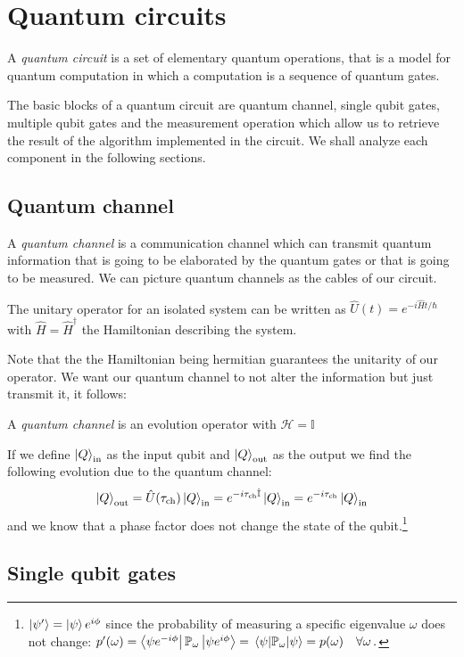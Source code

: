 \section{Quantum circuits}
A \emph{quantum circuit} is a set of elementary quantum operations, that is a model for quantum computation in which a computation is a sequence of quantum gates.

The basic blocks of a quantum circuit are quantum channel, single qubit gates, multiple qubit gates and the measurement operation which allow us to retrieve the result of the algorithm implemented in the circuit. We shall analyze each component in the following sections.
\subsection{Quantum channel}
A \emph{quantum channel} is a communication channel which can transmit quantum information that is going to be elaborated by the quantum gates or that is going to be measured. We can picture quantum channels as the cables of our circuit.
\begin{theorem}
The unitary operator for an isolated system can be written as $\hat{U}(t) = e^{-i\hat{H}t/\hbar}$ with $\hat{H} = \hat{H}^\dagger$ the Hamiltonian describing the system.
\end{theorem}
Note that the the Hamiltonian being hermitian guarantees the unitarity of our operator. We want our quantum channel to not alter the information but just transmit it, it follows:
\begin{defn}
A \emph{quantum channel} is an evolution operator with $\mathcal{H}=\mathbb{I}$
\end{defn}
If we define $\ket{Q}_\text{in}$ as the input qubit and $\ket{Q}_\text{out}$ as the output we find the following evolution due to the quantum channel:
\begin{equation*}
    \ket{Q}_\text{out} = \hat{U}(\tau_\text{ch}) \ket{Q}_\text{in} = e^{-i\tau_\text{ch}\hat{\mathbb{I}}} \ket{Q}_\text{in} = e^{-i\tau_\text{ch}} \ket{Q}_\text{in}
\end{equation*}
and we know that a phase factor does not change the state of the qubit.\footnote{$\ket{\psi'}= \ket{\psi}e^{i\phi}$ since the probability of measuring a specific eigenvalue $\omega$ does not change: $p'(\omega) = \bra{\psi e^{-i\phi}}\mathbb{P}_\omega\ket{\psi e^{i\phi}} = \expval{\mathbb{P}_\omega}{\psi} = p(\omega) \quad \forall \omega\,.$}
\subsection{Single qubit gates}

